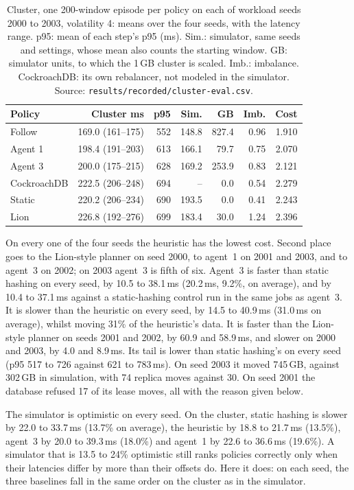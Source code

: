 \begin{table}[t]
\caption{Cluster, one 200-window episode per policy on each of workload seeds
2000 to 2003, volatility 4: means over the four seeds, with the latency range.
p95: mean of each step's p95 (ms). Sim.: simulator, same seeds and settings,
whose mean also counts the starting window. GB: simulator units, to which the
1\,GB cluster is scaled. Imb.: imbalance. CockroachDB: its own rebalancer, not
modeled in the simulator. Source: \texttt{results/recorded/cluster-eval.csv}.}
\label{tab:clustereval}
\centering
\small
\setlength{\tabcolsep}{2.8pt}
\begin{tabular}{lrrrrrr}
\toprule
Policy & Cluster ms & p95 & Sim. & GB & Imb. & Cost \\
\midrule
Follow & 169.0 (161--175) & 552 & 148.8 & 827.4 & 0.96 & 1.910 \\
Agent 1 & 198.4 (191--203) & 613 & 166.1 &  79.7 & 0.75 & 2.070 \\
Agent 3 & 200.0 (175--215) & 628 & 169.2 & 253.9 & 0.83 & 2.121 \\
CockroachDB & 222.5 (206--248) & 694 & -- & 0.0 & 0.54 & 2.279 \\
Static & 220.2 (206--234) & 690 & 193.5 &   0.0 & 0.41 & 2.243 \\
Lion   & 226.8 (192--276) & 699 & 183.4 &  30.0 & 1.24 & 2.396 \\
\bottomrule
\end{tabular}
\end{table}

On every one of the four seeds the heuristic has the lowest cost. Second place goes to the Lion-style planner on seed 2000, to agent~1 on 2001 and 2003, and to agent~3 on 2002; on 2003 agent~3 is fifth of six. Agent~3 is faster than static hashing on every seed, by 10.5 to 38.1\,ms (20.2\,ms, 9.2\%, on average), and by 10.4 to 37.1\,ms against a static-hashing control run in the same jobs as agent~3. It is slower than the heuristic on every seed, by 14.5 to 40.9\,ms (31.0\,ms on average), whilst moving 31\% of the heuristic's data. It is faster than the Lion-style planner on seeds 2001 and 2002, by 60.9 and 58.9\,ms, and slower on 2000 and 2003, by 4.0 and 8.9\,ms. Its tail is lower than static
hashing's on every seed (p95 517 to 726 against 621 to 783\,ms). On seed 2003 it moved 745\,GB, against 302\,GB in simulation, with 74 replica moves against 30. On seed 2001 the database refused 17 of its lease moves, all with the reason given below.

The simulator is optimistic on every seed. On the cluster, static hashing is
slower by 22.0 to 33.7\,ms (13.7\% on average), the heuristic by 18.8 to 21.7\,ms
(13.5\%), agent~3 by 20.0 to 39.3\,ms (18.0\%) and agent~1 by 22.6 to 36.6\,ms (19.6\%). A
simulator that is 13.5 to 24\% optimistic still ranks policies correctly only when their latencies
differ by more than their offsets do. Here it does: on each seed, the three
baselines fall in the same order on the cluster as in the simulator.

